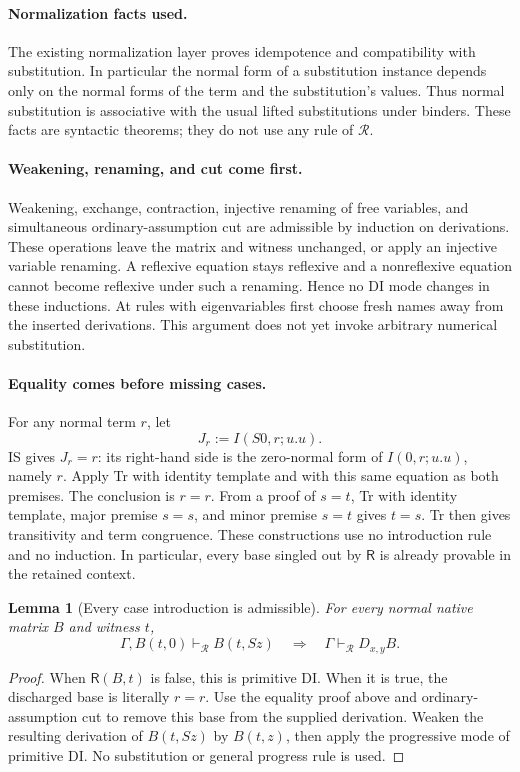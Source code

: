 \documentclass[11pt,a4paper]{article}
\newtheorem{lemma}[theorem]{Lemma}
\theoremstyle{definition}
\begin{document}
\paragraph{Normalization facts used.}
The existing normalization layer proves idempotence and compatibility
with substitution.  In particular the normal form of a substitution
instance depends only on the normal forms of the term and the
substitution's values.  Thus normal substitution is associative with
the usual lifted substitutions under binders.  These facts are
syntactic theorems; they do not use any rule of $\mathcal R$.

\paragraph{Weakening, renaming, and cut come first.}
Weakening, exchange, contraction, injective renaming of free variables,
and simultaneous ordinary-assumption cut are admissible by induction on
derivations.  These operations leave the matrix and witness unchanged,
or apply an injective variable renaming.  A reflexive equation stays
reflexive and a nonreflexive equation cannot become reflexive under
such a renaming.  Hence no DI mode changes in these inductions.
At rules with eigenvariables first choose fresh names away from the
inserted derivations.  This argument does not yet invoke arbitrary
numerical substitution.

\paragraph{Equality comes before missing cases.}
For any normal term $r$, let
\[
 J_r:=I(S0,r;u.u).
\]
IS gives $J_r=r$: its right-hand side is the zero-normal form of
$I(0,r;u.u)$, namely $r$.  Apply Tr with identity template and with this
same equation as both premises.  The conclusion is $r=r$.
From a proof of $s=t$, Tr with identity template, major premise $s=s$,
and minor premise $s=t$ gives $t=s$.  Tr then gives transitivity and
term congruence.  These constructions use no introduction rule and no
induction.  In particular, every base singled out by $\mathsf R$ is
already provable in the retained context.

\begin{lemma}[Every case introduction is admissible]
\label{lem:reflexive-all-cases}
For every normal native matrix $B$ and witness $t$,
\[
 \Gamma,B(t,0)\vdash_{\mathcal R}B(t,Sz)
 \quad\Longrightarrow\quad
 \Gamma\vdash_{\mathcal R}D_{x,y}B.
\]
\end{lemma}
\begin{proof}
When $\mathsf R(B,t)$ is false, this is primitive DI.  When it is true,
the discharged base is literally $r=r$.  Use the equality proof above
and ordinary-assumption cut to remove this base from the supplied
derivation.  Weaken the resulting derivation of $B(t,Sz)$ by $B(t,z)$,
then apply the progressive mode of primitive DI.  No substitution or
general progress rule is used.
\end{proof}
\end{document}
